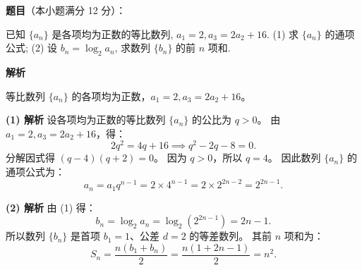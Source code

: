 \begin{answer}

\textbf{题目}（本小题满分 12 分）：

已知 $\{a_n\}$ 是各项均为正数的等比数列, $a_1 = 2, a_3 = 2a_2 + 16$.
(1) 求 $\{a_n\}$ 的通项公式;
(2) 设 $b_n = \log_2 a_n$, 求数列 $\{b_n\}$ 的前 $n$ 项和.

\textbf{解析}

等比数列 $\{a_n\}$ 的各项均为正数，$a_1 = 2, a_3 = 2a_2 + 16$。

\textbf{(1) 解析}
设各项均为正数的等比数列 $\{a_n\}$ 的公比为 $q > 0$。
由 $a_1 = 2, a_3 = 2a_2 + 16$，得：
\nopagebreak[4]
\[2q^2 = 4q + 16 \implies q^2 - 2q - 8 = 0.\]
分解因式得 $(q - 4)(q + 2) = 0$。
因为 $q > 0$，所以 $q = 4$。
因此数列 $\{a_n\}$ 的通项公式为：
\nopagebreak[4]
\[a_n = a_1 q^{n-1} = 2 \times 4^{n-1} = 2 \times 2^{2n-2} = 2^{2n-1}.\]

\textbf{(2) 解析}
由 (1) 得：
\nopagebreak[4]
\[b_n = \log_2 a_n = \log_2(2^{2n-1}) = 2n - 1.\]
所以数列 $\{b_n\}$ 是首项 $b_1 = 1$、公差 $d = 2$ 的等差数列。
其前 $n$ 项和为：
\nopagebreak[4]
\[S_n = \frac{n(b_1 + b_n)}{2} = \frac{n(1 + 2n - 1)}{2} = n^2.\]



\end{answer}
